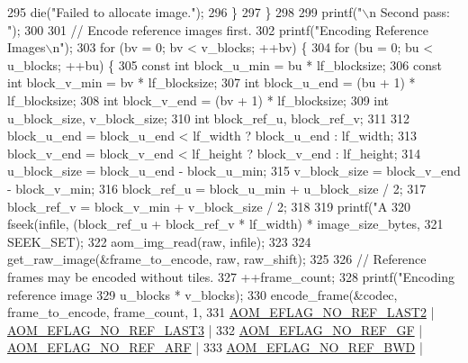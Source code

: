 \begin{DoxyCodeInclude}
{{{{{295       die(\textcolor{stringliteral}{"Failed to allocate image."});
296     \}
297   \}
298 
299   printf(\textcolor{stringliteral}{"\(\backslash\)n Second pass: "});
300 
301   \textcolor{comment}{// Encode reference images first.}
302   printf(\textcolor{stringliteral}{"Encoding Reference Images\(\backslash\)n"});
303   \textcolor{keywordflow}{for} (bv = 0; bv < v\_blocks; ++bv) \{
304     \textcolor{keywordflow}{for} (bu = 0; bu < u\_blocks; ++bu) \{
305       \textcolor{keyword}{const} \textcolor{keywordtype}{int} block\_u\_min = bu * lf\_blocksize;
306       \textcolor{keyword}{const} \textcolor{keywordtype}{int} block\_v\_min = bv * lf\_blocksize;
307       \textcolor{keywordtype}{int} block\_u\_end = (bu + 1) * lf\_blocksize;
308       \textcolor{keywordtype}{int} block\_v\_end = (bv + 1) * lf\_blocksize;
309       \textcolor{keywordtype}{int} u\_block\_size, v\_block\_size;
310       \textcolor{keywordtype}{int} block\_ref\_u, block\_ref\_v;
311 
312       block\_u\_end = block\_u\_end < lf\_width ? block\_u\_end : lf\_width;
313       block\_v\_end = block\_v\_end < lf\_height ? block\_v\_end : lf\_height;
314       u\_block\_size = block\_u\_end - block\_u\_min;
315       v\_block\_size = block\_v\_end - block\_v\_min;
316       block\_ref\_u = block\_u\_min + u\_block\_size / 2;
317       block\_ref\_v = block\_v\_min + v\_block\_size / 2;
318 
319       printf(\textcolor{stringliteral}{"A%
320       fseek(infile, (block\_ref\_u + block\_ref\_v * lf\_width) * image\_size\_bytes,
321             SEEK\_SET);
322       aom\_img\_read(raw, infile);
323 
324       get\_raw\_image(&frame\_to\_encode, raw, raw\_shift);
325 
326       \textcolor{comment}{// Reference frames may be encoded without tiles.}
327       ++frame\_count;
328       printf(\textcolor{stringliteral}{"Encoding reference image %
329              u\_blocks * v\_blocks);
330       encode\_frame(&codec, frame\_to\_encode, frame\_count, 1,
331                    \hyperlink{group__aom__encoder_ga50c2560ca6670298cfc614ecae96a391}{AOM\_EFLAG\_NO\_REF\_LAST2} | 
      \hyperlink{group__aom__encoder_gaa4bc8ae2b977b73f0ef57ba428ca1d2c}{AOM\_EFLAG\_NO\_REF\_LAST3} |
332                        \hyperlink{group__aom__encoder_gaaef6fe76991abf87edd2f296eee999f8}{AOM\_EFLAG\_NO\_REF\_GF} | 
      \hyperlink{group__aom__encoder_ga9e2f989737d63ddf4e987a525d186a46}{AOM\_EFLAG\_NO\_REF\_ARF} |
333                        \hyperlink{group__aom__encoder_ga758649aa6cd9fefb15ad888489884a38}{AOM\_EFLAG\_NO\_REF\_BWD} | 
}}}}}}}
\end{DoxyCodeInclude}
